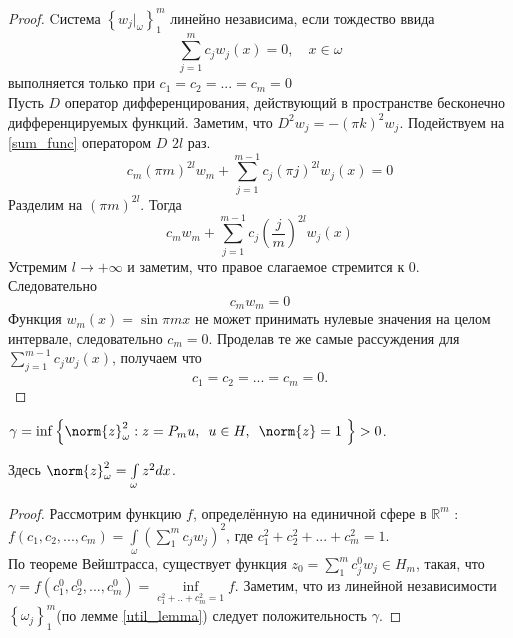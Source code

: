 \begin{proof}
Cистема $\left\{ w_j|_{\omega} \right\}^m_1$ линейно независима, если тождество ввида
\begin{equation}\label{sum_func}
	\sum \limits_{j = 1}^m{c_j w_j(x)} = 0, \quad x \in \omega
\end{equation}
выполняется только при $c_1 = c_2 = ... = c_m = 0$\\

Пусть $D$ оператор дифференцирования, действующий в пространстве бесконечно дифференцируемых функций.
Заметим, что $D^2 w_j = -(\pi k)^2 w_j$. Подействуем  на \eqref{sum_func} оператором $D$ $2l$ раз.
\begin{equation*}
	c_m (\pi m)^{2l} w_m + \sum \limits_{j = 1}^{m - 1}{c_j (\pi j)^{2l} w_j(x)} = 0
\end{equation*}
Разделим на $(\pi m)^{2l}$. Тогда
\begin{equation*}
	c_m w_m + \sum \limits_{j = 1}^{m - 1}{c_j \left(\frac{j}{m}\right)^{2l} w_j(x)}
\end{equation*}
Устремим $l \rightarrow +\infty$ и заметим, что правое слагаемое стремится к 0.\\ 
Следовательно
\begin{equation*}
	c_m w_m = 0
\end{equation*}
Функция $w_m(x) = \sin{\pi m x}$ не может принимать нулевые значения на целом интервале, следовательно $c_m = 0$. Проделав те же самые рассуждения для $\sum \limits_{j = 1}^{m - 1}{c_j w_j(x)}$, получаем что 
\begin{equation*}
	c_1 = c_2 = ... = c_m = 0.
\end{equation*}
\end{proof}
\par
\vspace{2ex}
\begin{lemma}\label{main_lemma}
$\gamma = \inf{ \left\{ \norm{z}^2_{\omega} : z = P_mu,\enskip u \in H, \enskip \norm{z} = 1 \ \right\} } > 0$.\\
\par Здесь $\norm{z}^2_{\omega} = \int\limits_{\omega}{z^2dx}$.
\end{lemma}
\begin{proof}
Рассмотрим функцию $f$, определённую на единичной сфере в $\mathbb{R}^m$ :\\
$f(c_1, c_2, ..., c_m) = \int \limits_{\omega} {(\sum\limits_1^m {c_j w_j})^2}$, где $c_1^2 + c_2^2 + ... + c^2_m = 1$.\\
По теореме Вейштрасса, существует функция $z_0 = \sum\limits_1^m {c_j^0 w_j} \in H_m$, такая, что \\
$\gamma = f(c_1^0, c_2^0, ..., c_m^0) = \inf \limits_{c_1^2 + .. + c_m^2 = 1} {f}$. Заметим, что из линейной независимости $\left\{ \omega_j \right\}^m_1$(по лемме \ref{util_lemma}) следует положительность $\gamma$.
\end{proof}

